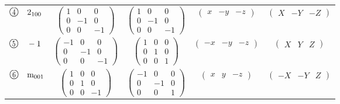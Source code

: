 \documentclass[fleqn,10pt,landscape]{jsarticle}
\begin{document}
\begin{center}
\begin{longtable}{lcccc}
$ {\ooalign{\hfil\resizebox{.8\width}{\height}{4}\hfil\crcr\raise.1ex\hbox{\large$\bigcirc$}}}\quad 2{}_{100} $ & $ \begin{pmatrix} 1 & 0 & 0 \\ 0 & -1 & 0 \\ 0 & 0 & -1 \end{pmatrix} $ & $ \begin{pmatrix} 1 & 0 & 0 \\ 0 & -1 & 0 \\ 0 & 0 & -1 \end{pmatrix} $ & $ \begin{pmatrix} x & - y & - z \end{pmatrix} $ & $ \begin{pmatrix} X & - Y & - Z \end{pmatrix} $ \\
$ {\ooalign{\hfil\resizebox{.8\width}{\height}{5}\hfil\crcr\raise.1ex\hbox{\large$\bigcirc$}}}\quad -1 $ & $ \begin{pmatrix} -1 & 0 & 0 \\ 0 & -1 & 0 \\ 0 & 0 & -1 \end{pmatrix} $ & $ \begin{pmatrix} 1 & 0 & 0 \\ 0 & 1 & 0 \\ 0 & 0 & 1 \end{pmatrix} $ & $ \begin{pmatrix} - x & - y & - z \end{pmatrix} $ & $ \begin{pmatrix} X & Y & Z \end{pmatrix} $ \\
$ {\ooalign{\hfil\resizebox{.8\width}{\height}{6}\hfil\crcr\raise.1ex\hbox{\large$\bigcirc$}}}\quad {\rm m}_{001} $ & $ \begin{pmatrix} 1 & 0 & 0 \\ 0 & 1 & 0 \\ 0 & 0 & -1 \end{pmatrix} $ & $ \begin{pmatrix} -1 & 0 & 0 \\ 0 & -1 & 0 \\ 0 & 0 & 1 \end{pmatrix} $ & $ \begin{pmatrix} x & y & - z \end{pmatrix} $ & $ \begin{pmatrix} - X & - Y & Z \end{pmatrix} $ \\

\end{longtable}
\end{center}
\end{document}
